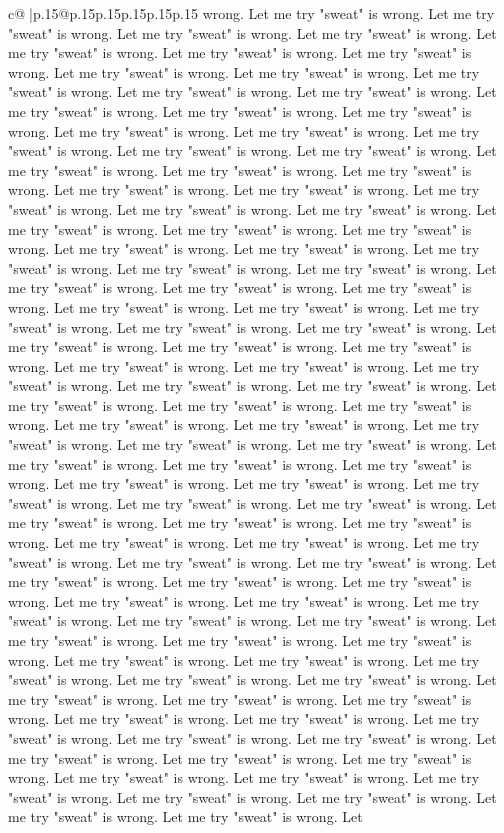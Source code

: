 \documentclass{article}
\begin{document}
{\begin{supertabular}{c@{$\;$}|p{.15\linewidth}@{}p{.15\linewidth}p{.15\linewidth}p{.15\linewidth}p{.15\linewidth}p{.15\linewidth}}
{{{wrong. Let me try "sweat" is wrong. Let me try "sweat" is wrong. Let me try "sweat" is wrong. Let me try "sweat" is wrong. Let me try "sweat" is wrong. Let me try "sweat" is wrong. Let me try "sweat" is wrong. Let me try "sweat" is wrong. Let me try "sweat" is wrong. Let me try "sweat" is wrong. Let me try "sweat" is wrong. Let me try "sweat" is wrong. Let me try "sweat" is wrong. Let me try "sweat" is wrong. Let me try "sweat" is wrong. Let me try "sweat" is wrong. Let me try "sweat" is wrong. Let me try "sweat" is wrong. Let me try "sweat" is wrong. Let me try "sweat" is wrong. Let me try "sweat" is wrong. Let me try "sweat" is wrong. Let me try "sweat" is wrong. Let me try "sweat" is wrong. Let me try "sweat" is wrong. Let me try "sweat" is wrong. Let me try "sweat" is wrong. Let me try "sweat" is wrong. Let me try "sweat" is wrong. Let me try "sweat" is wrong. Let me try "sweat" is wrong. Let me try "sweat" is wrong. Let me try "sweat" is wrong. Let me try "sweat" is wrong. Let me try "sweat" is wrong. Let me try "sweat" is wrong. Let me try "sweat" is wrong. Let me try "sweat" is wrong. Let me try "sweat" is wrong. Let me try "sweat" is wrong. Let me try "sweat" is wrong. Let me try "sweat" is wrong. Let me try "sweat" is wrong. Let me try "sweat" is wrong. Let me try "sweat" is wrong. Let me try "sweat" is wrong. Let me try "sweat" is wrong. Let me try "sweat" is wrong. Let me try "sweat" is wrong. Let me try "sweat" is wrong. Let me try "sweat" is wrong. Let me try "sweat" is wrong. Let me try "sweat" is wrong. Let me try "sweat" is wrong. Let me try "sweat" is wrong. Let me try "sweat" is wrong. Let me try "sweat" is wrong. Let me try "sweat" is wrong. Let me try "sweat" is wrong. Let me try "sweat" is wrong. Let me try "sweat" is wrong. Let me try "sweat" is wrong. Let me try "sweat" is wrong. Let me try "sweat" is wrong. Let me try "sweat" is wrong. Let me try "sweat" is wrong. Let me try "sweat" is wrong. Let me try "sweat" is wrong. Let me try "sweat" is wrong. Let me try "sweat" is wrong. Let me try "sweat" is wrong. Let me try "sweat" is wrong. Let me try "sweat" is wrong. Let me try "sweat" is wrong. Let me try "sweat" is wrong. Let me try "sweat" is wrong. Let me try "sweat" is wrong. Let me try "sweat" is wrong. Let me try "sweat" is wrong. Let me try "sweat" is wrong. Let me try "sweat" is wrong. Let me try "sweat" is wrong. Let me try "sweat" is wrong. Let me try "sweat" is wrong. Let me try "sweat" is wrong. Let me try "sweat" is wrong. Let me try "sweat" is wrong. Let me try "sweat" is wrong. Let me try "sweat" is wrong. Let me try "sweat" is wrong. Let me try "sweat" is wrong. Let me try "sweat" is wrong. Let me try "sweat" is wrong. Let me try "sweat" is wrong. Let me try "sweat" is wrong. Let me try "sweat" is wrong. Let me try "sweat" is wrong. Let me try "sweat" is wrong. Let me try "sweat" is wrong. Let me try "sweat" is wrong. Let me try "sweat" is wrong. Let me try "sweat" is wrong. Let me try "sweat" is wrong. Let me try "sweat" is wrong. Let me try "sweat" is wrong. Let me try "sweat" is wrong. Let me try "sweat" is wrong. Let me try "sweat" is wrong. Let me try "sweat" is wrong. Let me try "sweat" is wrong. Let }}}
\end{supertabular}}
\end{document}
